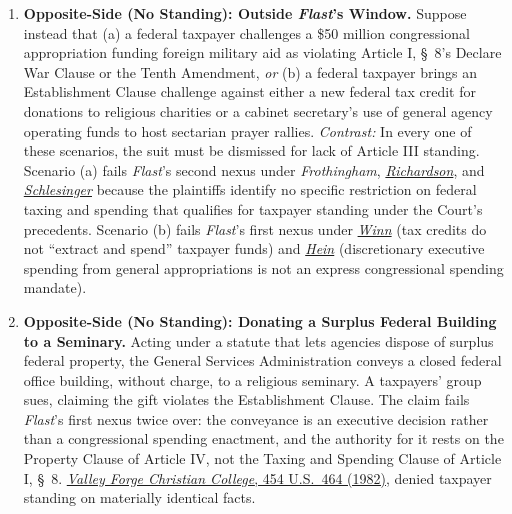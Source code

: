 \documentclass[12pt]{article}
\begin{document}
\begin{enumerate}
\item \textbf{Opposite-Side (No Standing): Outside \textit{Flast}'s Window.} Suppose instead that (a) a federal taxpayer challenges a \$50 million congressional appropriation funding foreign military aid as violating Article I, \S\ 8's Declare War Clause or the Tenth Amendment, \textit{or} (b) a federal taxpayer brings an Establishment Clause challenge against either a new federal tax credit for donations to religious charities or a cabinet secretary's use of general agency operating funds to host sectarian prayer rallies. \textit{Contrast:} In every one of these scenarios, the suit must be dismissed for lack of Article III standing. Scenario (a) fails \textit{Flast}'s second nexus under \textit{Frothingham}, \href{https://supreme.justia.com/cases/federal/us/418/166/}{\textit{Richardson}}, and \href{https://supreme.justia.com/cases/federal/us/418/208/}{\textit{Schlesinger}} because the plaintiffs identify no specific restriction on federal taxing and spending that qualifies for taxpayer standing under the Court's precedents. Scenario (b) fails \textit{Flast}'s first nexus under \href{https://supreme.justia.com/cases/federal/us/563/125/}{\textit{Winn}} (tax credits do not ``extract and spend'' taxpayer funds) and \href{https://supreme.justia.com/cases/federal/us/551/587/}{\textit{Hein}} (discretionary executive spending from general appropriations is not an express congressional spending mandate).

\item \textbf{Opposite-Side (No Standing): Donating a Surplus Federal Building to a Seminary.} Acting under a statute that lets agencies dispose of surplus federal property, the General Services Administration conveys a closed federal office building, without charge, to a religious seminary. A taxpayers' group sues, claiming the gift violates the Establishment Clause. The claim fails \textit{Flast}'s first nexus twice over: the conveyance is an executive decision rather than a congressional spending enactment, and the authority for it rests on the Property Clause of Article IV, not the Taxing and Spending Clause of Article I, \S\ 8. \href{https://supreme.justia.com/cases/federal/us/454/464/}{\textit{Valley Forge Christian College}, 454 U.S.\ 464 (1982)}, denied taxpayer standing on materially identical facts.


\end{enumerate}
\end{document}
